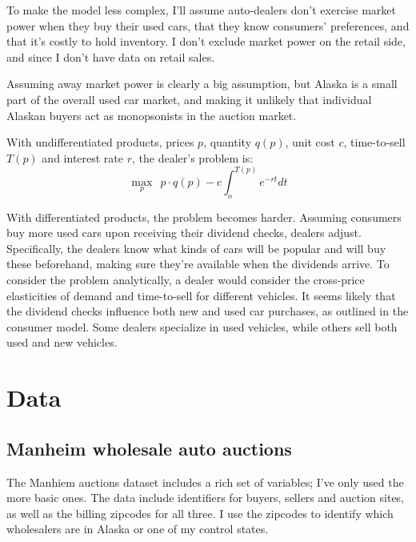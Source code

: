 \documentclass[11pt,letterpaper,oneside]{article}
\begin{document}
\begin{doublespacing}
To make the model less complex, I'll assume auto\hyp{}dealers don't exercise market power when they buy their used cars, that they know consumers' preferences, and that it's costly to hold inventory.
I don't exclude market power on the retail side, and since I don't have data on retail sales.

Assuming away market power is clearly a big assumption, but Alaska is a small part of the overall used car market, and making it unlikely that individual Alaskan buyers act as monopsonists in the auction market.

With undifferentiated products, prices $p$, quantity $q(p)$, unit cost $c$, time-to-sell $T(p)$ and interest rate $r$, the dealer's problem is:
\[
\max_p \ \ p \cdot q(p) - c \int_o^{T(p)} e^{-rt}dt
\]

With differentiated products, the problem becomes harder.
Assuming consumers buy more used cars upon receiving their dividend checks, dealers adjust.
Specifically, the dealers know what kinds of cars will be popular and will buy these beforehand, making sure they're available when the dividends arrive.
To consider the problem analytically, a dealer would consider the cross-price elasticities of demand and time-to-sell for different vehicles.
It seems likely that  the dividend checks influence both new and used car purchases, as outlined in the consumer model.
Some dealers specialize in used vehicles, while others sell both used and new vehicles.



\section{Data}
\label{sec:data}

\subsection{Manheim wholesale auto auctions}
\label{sec:manheim-data}



The Manhiem auctions dataset includes a rich set of variables; I've only used the more basic ones.
The data include identifiers for buyers, sellers and auction sites, as well as the billing zipcodes for all three.
I use the zipcodes to identify which wholesalers are in Alaska or one of my control states.


\end{doublespacing}
\end{document}
